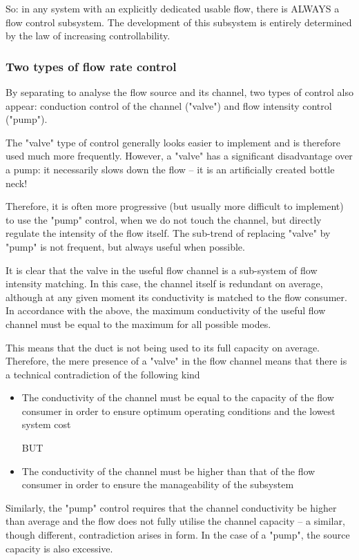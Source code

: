 \documentclass[a4paper,11pt]{article}
\begin{document}
So: in any system with an explicitly dedicated usable flow, there is ALWAYS a
flow control subsystem. The development of this subsystem is entirely
determined by the law of increasing controllability.

\subsubsection*{Two types of flow rate control}

By separating to analyse the flow source and its channel, two types of control
also appear: conduction control of the channel ("valve") and flow intensity
control ("pump").

The "valve" type of control generally looks easier to implement and is
therefore used much more frequently. However, a "valve" has a significant
disadvantage over a pump: it necessarily slows down the flow -- it is an
artificially created bottle neck!

Therefore, it is often more progressive (but usually more difficult to
implement) to use the "pump" control, when we do not touch the channel, but
directly regulate the intensity of the flow itself. The sub-trend of replacing
"valve" by "pump" is not frequent, but always useful when possible.

It is clear that the valve in the useful flow channel is a sub-system of flow
intensity matching. In this case, the channel itself is redundant on average,
although at any given moment its conductivity is matched to the flow
consumer. In accordance with the above, the maximum conductivity of the useful
flow channel must be equal to the maximum for all possible modes.

This means that the duct is not being used to its full capacity on
average. Therefore, the mere presence of a "valve" in the flow channel means
that there is a technical contradiction of the following kind
\begin{itemize}
\item The conductivity of the channel must be equal to the capacity of the
  flow consumer in order to ensure optimum operating conditions and the lowest
  system cost

  BUT
  
\item The conductivity of the channel must be higher than that of the flow
  consumer in order to ensure the manageability of the subsystem
\end{itemize}
Similarly, the "pump" control requires that the channel conductivity be higher
than average and the flow does not fully utilise the channel capacity -- a
similar, though different, contradiction arises in form. In the case of a
"pump", the source capacity is also excessive.
\end{document}
